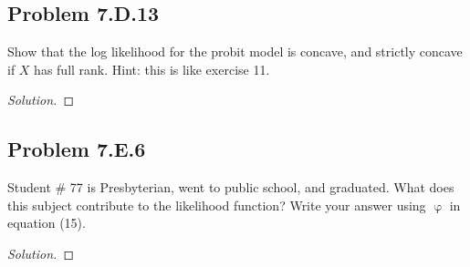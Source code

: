 \documentclass{amsart}
\DeclareMathOperator{\ph}{\varphi}
\begin{document}
		\subsection{Problem 7.D.13} %
		\label{sub:problem_7_d_13}
			Show that the log likelihood for the probit model is concave, and strictly concave if $X$ has full rank. 
			Hint: this is like exercise 11.
		\begin{proof}[Solution]
		\end{proof}

		\subsection{Problem 7.E.6} %
		\label{sub:problem_7_e_6}
			Student \# 77 is Presbyterian, went to public school, and graduated. 
			What does this subject contribute to the likelihood function? 
			Write your answer using $\ph$ in equation (15).
		\begin{proof}[Solution]
		\end{proof}
\end{document}

